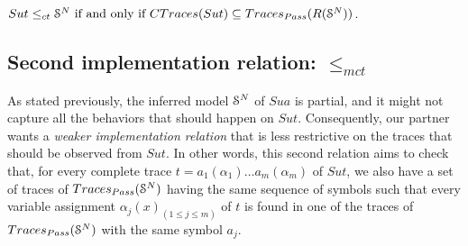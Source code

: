 \begin{proposition}
\label{rel:impl12}
${Sut} \leq_{ct} \EuScript{S}^{N} \text{ if and only if } CTraces({Sut})
\subseteq  Traces_{Pass}(R(\EuScript{S}^{N}))$.
\end{proposition}

\subsection{Second implementation relation: $\leq_{mct}$}

As stated previously, the inferred model $\EuScript{S}^{N}$ of
$\mathit{Sua}$ is partial, and it might not capture all the
behaviors that should happen on $\mathit{Sut}$. Consequently,
our partner wants a \emph{weaker implementation relation} that is
less restrictive on the traces that should be observed from
$\mathit{Sut}$.  In other words, this second relation aims to
check that, for every complete trace $t=a_1(\alpha_1) \dots
a_m(\alpha_m)$ of $\mathit{Sut}$, we also have a set of traces of
$Traces_{Pass}(\EuScript{S}^{N})$ having the same sequence of
symbols such that every variable assignment $\alpha_j(x)_{(1 \leq
j \leq m)}$ of $t$ is found in one of the traces of
$Traces_{Pass}(\EuScript{S}^{N})$ with the same symbol $a_j$.

